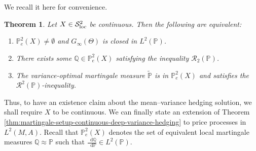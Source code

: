 \documentclass[11pt,a4paper,twoside,openany]{report}
\numberwithin{equation}{section}
\newcommand{\diff}{\mathop{}\!\mathrm{d}}
\theoremstyle{plain} %
\newtheorem{theorem}{Theorem}[section]
\theoremstyle{definition} %
\theoremstyle{remark} %
\begin{document}
We recall it here for convenience.
\begin{theorem}\label{thm:recalling closedness of G_T(Theta)}
Let $X\in\mathcal{S}^2_{\rm{loc}}$ be continuous. Then the following are equivalent:
\begin{enumerate}
\item \(\mathbb{P}_e^2(X)\neq\emptyset\) and
 $G_{\infty}(\Theta)$ is closed in $L^2(\mathbb{P})$.
\item There exists some \(\mathbb{Q}\in\mathbb{P}_e^2(X)\) satisfying the inequality
      $\mathcal{R}_2(\mathbb{P})$.
\item The variance-optimal martingale measure \(\widetilde{\mathbb{P}}\) is in \(\mathbb{\mathbb{P}}_e^2(X)\) and satisfies the \(\mathcal{R}^2(\mathbb{P})\)-inequality.
\end{enumerate}
\end{theorem}
Thus, to have an existence claim about the mean--variance hedging solution, we shall require \(X\) to be continuous. We can finally state an extension of 
Theorem \ref{thm:martingale-setup-continuous-deep-variance-hedging} to price processes in \(L^2(M,A)\). Recall that  \(\mathbb{\mathbb{P}}_e^2(X)\) denotes the set of equivalent local martingale measures \(\mathbb{Q}\approx \mathbb{P}\) such that \(\frac{\diff \mathbb{Q}}{\diff \mathbb{P}}\in L^2(\mathbb{P})\).
\end{document}
